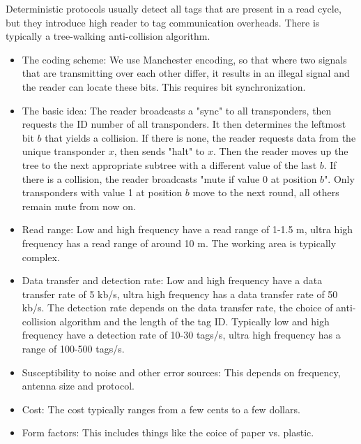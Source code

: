 \begin{mytitle} Deterministic protocols usually detect all tags that are present in a read cycle, but they introduce high reader to tag communication overheads. There is typically a tree-walking anti-collision algorithm.
    \begin{mysubtitle} \hfill
    \begin{itemize}
        \item The coding scheme: We use Manchester encoding, so that where two signals that are transmitting over each other differ, it results in an illegal signal and the reader can locate these bits. This requires bit synchronization.
        
        \item The basic idea: The reader broadcasts a "sync" to all transponders, then requests the ID number of all transponders. It then determines the leftmost bit $b$ that yields a collision. If there is none, the reader requests data from the unique transponder $x$, then sends "halt" to $x$. Then the reader moves up the tree to the next appropriate subtree with a different value of the last $b$. If there is a collision, the reader broadcasts "mute if value 0 at position $b$". Only transponders with value 1 at position $b$ move to the next round, all others remain mute from now on.
    \end{itemize}
    \end{mysubtitle}
\end{mytitle}

\begin{mytitle} \hfill
\begin{itemize}
    \item Read range: Low and high frequency have a read range of 1-1.5 m, ultra high frequency has a read range of around 10 m. The working area is typically complex.
    \item Data transfer and detection rate: Low and high frequency have a data transfer rate of 5 kb/s, ultra high frequency has a data transfer rate of 50 kb/s. The detection rate depends on the data transfer rate, the choice of anti-collision algorithm and the length of the tag ID. Typically low and high frequency have a detection rate of 10-30 tags/s, ultra high frequency has a range of 100-500 tags/s.
    \item Susceptibility to noise and other error sources: This depends on frequency, antenna size and protocol.
    \item Cost: The cost typically ranges from a few cents to a few dollars.
    \item Form factors: This includes things like the coice of paper vs. plastic.
\end{itemize}
\end{mytitle}

